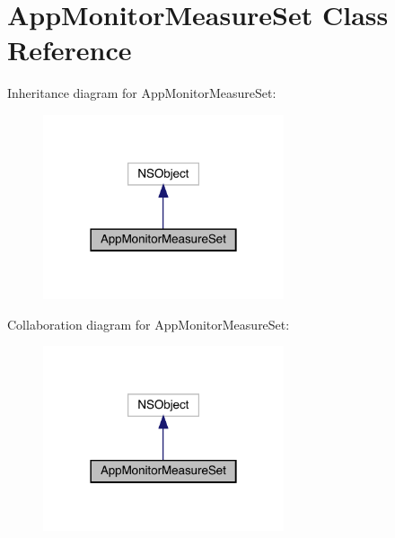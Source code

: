 \hypertarget{interface_app_monitor_measure_set}{}\section{App\+Monitor\+Measure\+Set Class Reference}
\label{interface_app_monitor_measure_set}


Inheritance diagram for App\+Monitor\+Measure\+Set\+:\nopagebreak
\begin{figure}[H]
\begin{center}
\leavevmode
\includegraphics[width=201pt]{interface_app_monitor_measure_set__inherit__graph}
\end{center}
\end{figure}


Collaboration diagram for App\+Monitor\+Measure\+Set\+:\nopagebreak
\begin{figure}[H]
\begin{center}
\leavevmode
\includegraphics[width=201pt]{interface_app_monitor_measure_set__coll__graph}
\end{center}
\end{figure}
